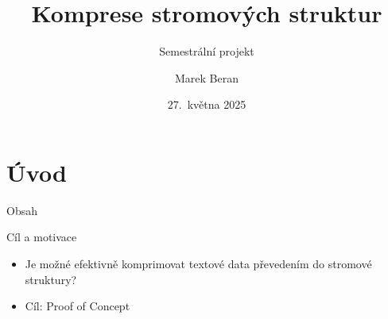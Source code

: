\documentclass[lualatex,hyperref={pdfencoding=auto}]{beamer}
\title[Komprese stromových struktur]{Komprese stromových struktur}
\subtitle{Semestrální projekt}
\author{Marek Beran}
\institute[VŠB-TUO]{VŠB -- Technická univerzita Ostrava\\\vspace{2mm}marek.beran.st@vsb.cz}
\date[27.~5.~2025]{27.~května 2025}
\begin{document}
\section{Úvod}

\begin{frame}{Obsah}
    \tableofcontents
\end{frame}

\begin{frame}{Cíl a motivace}

\begin{itemize}
    \item Je možné efektivně komprimovat textové data převedením do stromové struktury?
    \item Cíl: Proof of Concept
\end{itemize}
\end{frame}
\end{document}
